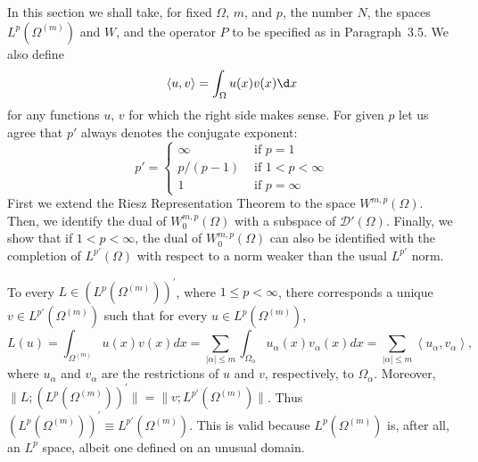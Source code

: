 \begin{para}
  In this section we shall take, for fixed $\Omega$, $m$, and $p$, the number $N$,
  the spaces $L^p(\Omega^{(m)})$ and $W$, and the operator $P$ to be specified as in 
  Paragraph~3.5. We also define
  \[
  \langle u, v\rangle = \int_{\Omega} u(x) v(x) \d x
  \]
  for any functions $u$, $v$ for which the right side makes sense.
  For given $p$ let us agree that $p'$ always denotes the conjugate exponent:
  \[
  p' = 
    \begin{cases}
      \infty & \text { if } p=1 \\
      p /(p-1) & \text { if } 1<p<\infty \\
      1 & \text { if } p=\infty
    \end{cases}
  \]
  First we extend the Riesz Representation Theorem to the space $W^{m,p}(\Omega)$.
  Then, we identify the dual of $W_0^{m, p}(\Omega)$ with a subspace of $\mathscr{D}'(\Omega)$. 
  Finally, we show that if $1<p<\infty$, the dual of $W_0^{m, p}(\Omega)$ can also be identified 
  with the completion of $L^{p'}(\Omega)$ with respect to a norm weaker than the
  usual $L^{p'}$ norm.
\end{para}


\begin{para}
  To every $L\in\left(L^p(\Omega^{(m)})\right)^{\prime}$, where $1 \leq p<\infty$, 
  there corresponds a unique $v \in L^{p'}(\Omega^{(m)})$ such that for every 
  $u \in L^p(\Omega^{(m)})$,
  \[
   L(u)=\int_{\Omega^{(m)}} u(x) v(x) d x=\sum_{|\alpha| \leq m} \int_{\Omega_\alpha} u_\alpha(x)v_\alpha(x) d x=\sum_{|\alpha| \leq m}\left\langle u_\alpha, v_\alpha\right\rangle,
  \]
  where $u_\alpha$ and $v_\alpha$ are the restrictions of $u$ and $v$, respectively, to $\Omega_\alpha$.
  Moreover, $\bigl\|L ;\left(L^p(\Omega^{(m)})\right)^{\prime}\bigr\|
    = \bigl\|v ; L^{p'}(\Omega^{(m)})\bigr\|$.
  Thus $\left(L^p(\Omega^{(m)})\right)^{\prime} \equiv L^{p'}(\Omega^{(m)})$.
  This is valid because $L^p(\Omega^{(m)})$ is,
  after all, an $L^p$ space, albeit one defined on an unusual domain.
\end{para}


